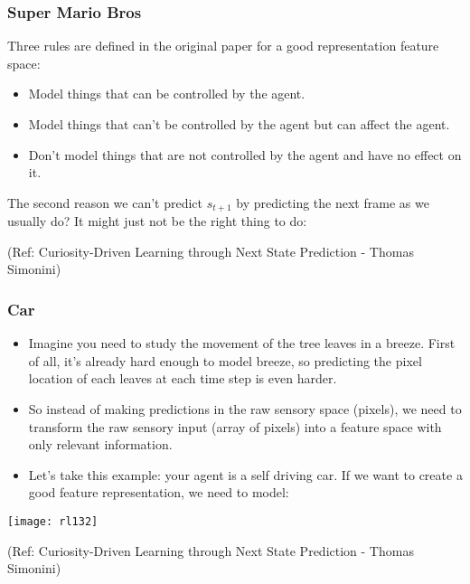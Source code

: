 \begin{frame}[fragile]\frametitle{Super Mario Bros}

Three rules are defined in the original paper for a good representation feature space:

\begin{itemize}
\item Model things that can be controlled by the agent.
\item Model things that can't be controlled by the agent but can affect the agent.
\item Don't model things that are not controlled by the agent and have no effect on it.
\end{itemize}

The second reason we can't predict $s_{t+1}$ by predicting the next frame as we usually do? It might just not be the right thing to do:

{\tiny (Ref: Curiosity-Driven Learning through Next State Prediction - Thomas Simonini)}


\end{frame}

\begin{frame}[fragile]\frametitle{Car}



\begin{itemize}
\item Imagine you need to study the movement of the tree leaves in a breeze. First of all, it's already hard enough to model breeze, so predicting the pixel location of each leaves at each time step is even harder.
\item So instead of making predictions in the raw sensory space (pixels), we need to transform the raw sensory input (array of pixels) into a feature space with only relevant information.
\item Let's take this example: your agent is a self driving car. If we want to create a good feature representation, we need to model:
\end{itemize}

\begin{center}
\texttt{[image: rl132]}
\end{center}


{\tiny (Ref: Curiosity-Driven Learning through Next State Prediction - Thomas Simonini)}


\end{frame}

